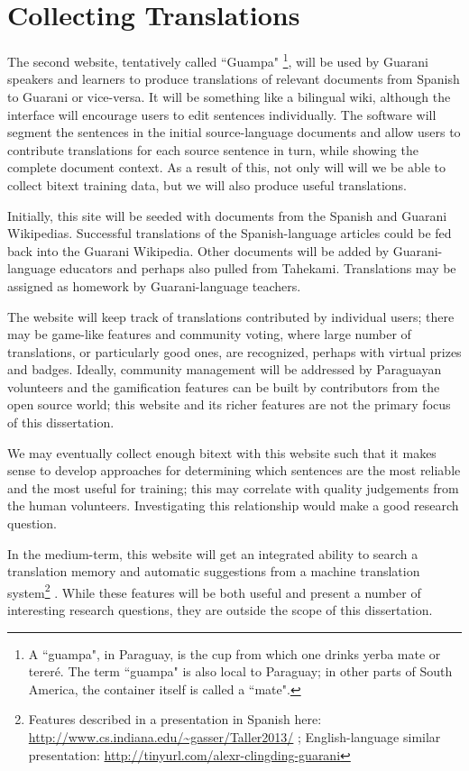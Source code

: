 \section{Collecting Translations}
The second website, tentatively called ``Guampa"
\footnote{A ``guampa", in Paraguay, is the cup from which one drinks yerba mate
or tereré. The term ``guampa" is also local to Paraguay; in other parts of
South America, the container itself is called a ``mate".},
will be used by Guarani speakers and learners to produce translations of
relevant documents from Spanish to Guarani or vice-versa.
It will be something like a bilingual wiki, although the interface will
encourage users to edit sentences individually.
The software will segment the sentences in the initial
source-language documents and allow users to contribute translations for each
source sentence in turn, while showing the complete document context.
As a result of this, not only will will we be able to collect bitext training
data, but we will also produce useful translations.

Initially, this site will be seeded with documents from the Spanish and Guarani
Wikipedias. Successful translations of the Spanish-language articles could be
fed back into the Guarani Wikipedia. Other documents will be added by
Guarani-language educators and perhaps also pulled from Tahekami. Translations
may be assigned as homework by Guarani-language teachers.

The website will keep track of translations contributed by individual users;
there may be game-like features and community voting, where large number of
translations, or particularly good ones, are recognized, perhaps with virtual
prizes and badges.
Ideally, community management will be addressed by Paraguayan volunteers and
the gamification features can be built by contributors from the open source
world; this website and its richer features are not the primary focus of this
dissertation.

We may eventually collect enough bitext with this website such that it makes
sense to develop approaches for determining which sentences are the most
reliable and the most useful for training; this may correlate with quality
judgements from the human volunteers.
Investigating this relationship would make a good research question.

In the medium-term, this website will get an integrated ability to search
a translation memory and automatic suggestions from a machine translation
system\footnote{Features described in a presentation in Spanish here:
\url{http://www.cs.indiana.edu/~gasser/Taller2013/} ; English-language similar
presentation: \url{http://tinyurl.com/alexr-clingding-guarani} }
. While these features will be both useful and present a number of
interesting research questions, they are outside the scope of this
dissertation.
